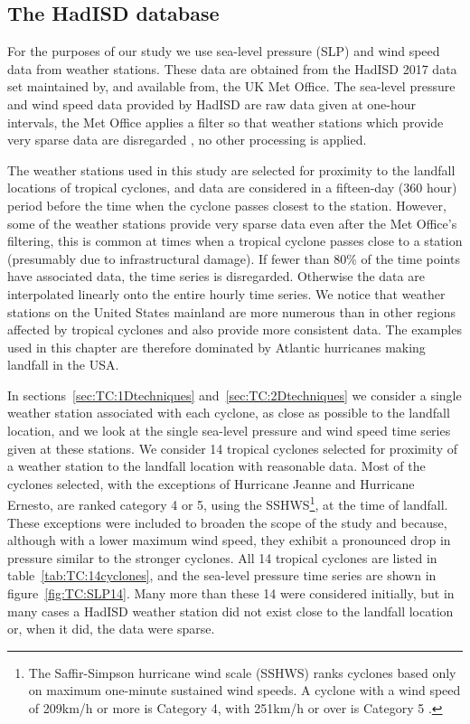 \subsection{The HadISD database}
\label{subsec:TC:data:HadISD}

For the purposes of our study we use sea-level pressure (SLP) and wind speed data from weather stations. These data are obtained from the HadISD 2017 data set \citep{HadISD_smith,HadISD_dunn12,HadISD_dunn14,HadISD_dunn16,HadISD} maintained by, and available from, the UK Met Office. The sea-level pressure and wind speed data provided by HadISD are raw data given at one-hour intervals, the Met Office applies a filter so that weather stations which provide very sparse data are disregarded \citep{HadISD_dunn12}, no other processing is applied.

The weather stations used in this study are selected for proximity to the landfall locations of tropical cyclones, and data are considered in a fifteen-day (360 hour) period before the time when the cyclone passes closest to the station. However, some of the weather stations provide very sparse data even after the Met Office's filtering, this is common at times when a tropical cyclone passes close to a station (presumably due to infrastructural damage). If fewer than 80\% of the time points have associated data, the time series is disregarded. Otherwise the data are interpolated linearly onto the entire hourly time series. We notice that weather stations on the United States mainland are more numerous than in other regions affected by tropical cyclones and also provide more consistent data. The examples used in this chapter are therefore dominated by Atlantic hurricanes making landfall in the USA.

In sections~\ref{sec:TC:1Dtechniques} and~\ref{sec:TC:2Dtechniques} we consider a single weather station associated with each cyclone, as close as possible to the landfall location, and we look at the single sea-level pressure and wind speed time series given at these stations. We consider 14 tropical cyclones selected for proximity of a weather station to the landfall location with reasonable data. Most of the cyclones selected, with the exceptions of Hurricane Jeanne and Hurricane Ernesto, are ranked category 4 or 5, using the SSHWS\footnote{The Saffir-Simpson hurricane wind scale (SSHWS) ranks cyclones based only on maximum one-minute sustained wind speeds. A cyclone with a wind speed of 209km/h or more is Category 4, with 251km/h or over is Category 5 \citep{NOAA_saffir}.}, at the time of landfall. These exceptions were included to broaden the scope of the study and because, although with a lower maximum wind speed, they exhibit a pronounced drop in pressure similar to the stronger cyclones. All 14 tropical cyclones are listed in table~\ref{tab:TC:14cyclones}, and the sea-level pressure time series are shown in figure~\ref{fig:TC:SLP14}. Many more than these 14 were considered initially, but in many cases a HadISD weather station did not exist close to the landfall location or, when it did, the data were sparse. 


